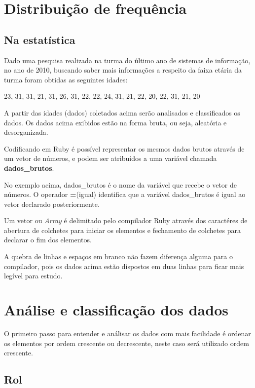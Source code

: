 \documentclass[espaco=simples,appendix=Name]{abnt}
\newcommand{\code}[1] {\textbf{#1}}
\begin{document}
\section{ Distribuição de frequência } 

\subsection { Na estatística }

Dado uma pesquisa realizada na turma do último ano de sistemas de informação, no ano de 2010, buscando saber mais informações a respeito da faixa etária da turma foram obtidas as seguintes idades:

23, 31, 31, 21, 31, 26, 31, 22, 22, 24, 31, 21, 22, 20, 22, 31, 21, 20

A partir das idades (dados) coletados acima serão analisados e classificados os dados. Os dados acima exibidos estão na forma bruta, ou seja, aleatória e desorganizada. 

Codificando em Ruby é possível representar os mesmos dados brutos através de um vetor de números, e podem ser atribuídos a uma variável chamada \code{dados\_brutos}.

 

No exemplo acima, dados\_brutos é o nome da variável que recebe o vetor de números. O operador \code{=}(igual) identifica que a variável dados\_brutos é igual ao vetor declarado posteriormente.

Um vetor ou \textit{Array} é delimitado pelo compilador Ruby através dos caractéres de abertura de colchetes para iniciar os elementos e fechamento de colchetes para declarar o fim dos elementos.

A quebra de linhas e espaços em branco não fazem diferença alguma para o compilador, pois os dados acima estão dispostos em duas linhas para ficar mais legível para estudo.


\section { Análise e classificação dos dados }

O primeiro passo para entender e análisar os dados com mais facilidade é ordenar os elementos por ordem crescente ou decrescente, neste caso será utilizado ordem crescente. 

\subsection { Rol }
\end{document}
